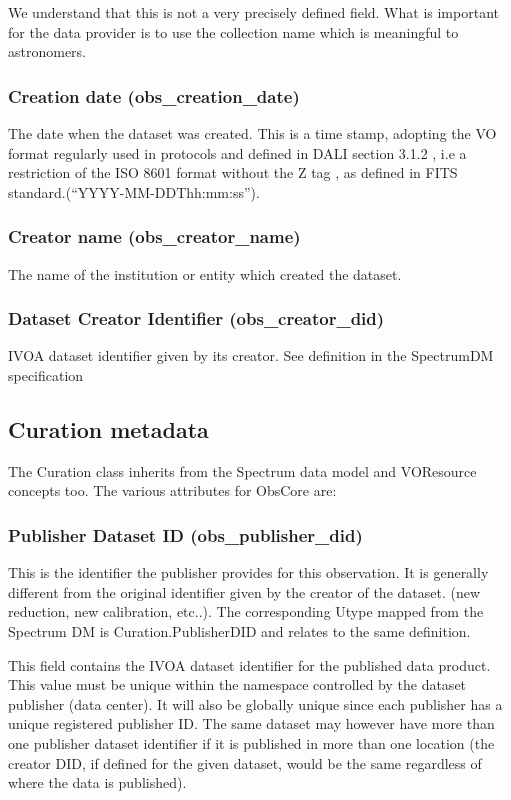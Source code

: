 \documentclass[11pt,a4paper]{ivoa}
\begin{document}
We understand that this is not a very precisely defined field. What is important for the data provider is to use the
collection name which is meaningful to astronomers.

\subsubsection{Creation date (obs\_creation\_date)}
The date when the dataset was created. This is a time stamp, adopting the VO format regularly used in protocols and
defined in DALI \cite{2013ivoa.spec.1129D} section 3.1.2 , i.e a restriction of the ISO 8601 format without the Z tag ,
as defined in FITS standard.(``YYYY-MM-DDThh:mm:ss'').

\subsubsection{Creator name (obs\_creator\_name)}
The name of the institution or entity which created the dataset.

\subsubsection{Dataset  Creator Identifier (obs\_creator\_did)}
IVOA dataset identifier given by its creator. See definition in the SpectrumDM specification \cite{2007ivoa.spec.1029M} 

\subsection{Curation metadata}
The Curation class inherits from the Spectrum data model and VOResource concepts too.  The various attributes for
ObsCore are:

\subsubsection{Publisher Dataset ID (obs\_publisher\_did)}
This is the identifier the publisher provides for this observation. It is generally different from the original
identifier given by the creator of the dataset. (new reduction, new calibration, etc..).  The corresponding Utype
mapped from the Spectrum DM is Curation.PublisherDID and relates to the same definition.

This field contains the IVOA dataset identifier \cite{2007ivoa.spec.0314P} for the published data product. This value
must be unique within the namespace controlled by the dataset publisher (data center).  It will also be globally unique
since each publisher has a unique registered publisher ID.  The same dataset may however have more than one publisher
dataset identifier if it is published in more than one location (the creator DID, if defined for the given dataset,
would be the same regardless of where the data is published).
\end{document}
